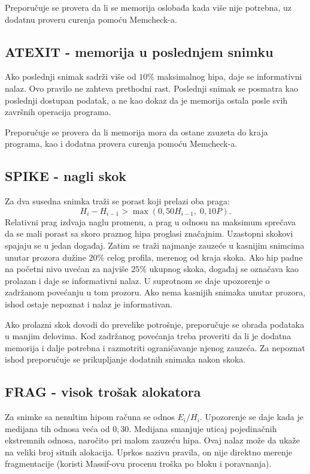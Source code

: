 \documentclass[a4paper,10pt]{article}
\begin{document}
Preporučuje se provera da li se memorija oslobađa kada više nije potrebna,
uz dodatnu proveru curenja pomoću Memcheck-a.

\subsection{ATEXIT - memorija u poslednjem snimku}
Ako poslednji snimak sadrži više od $10\%$ maksimalnog hipa, daje se informativni
nalaz. Ovo pravilo ne zahteva prethodni rast. Poslednji snimak se posmatra kao
poslednji dostupan podatak, a ne kao dokaz da je memorija ostala posle svih
završnih operacija programa.

Preporučuje se provera da li memorija mora da ostane zauzeta do kraja programa,
kao i dodatna provera curenja pomoću Memcheck-a.

\subsection{SPIKE - nagli skok}
Za dva susedna snimka traži se porast koji prelazi oba praga:
\[
  H_i-H_{i-1}>\max(0{,}50H_{i-1},\;0{,}10P).
\]
Relativni prag izdvaja naglu promenu, a prag u odnosu na maksimum sprečava da se
mali porast sa skoro praznog hipa proglasi značajnim. Uzastopni skokovi spajaju
se u jedan događaj. Zatim se traži najmanje zauzeće u kasnijim snimcima unutar
prozora dužine $20\%$ celog profila, merenog od kraja skoka.
Ako hip padne na početni nivo uvećan za najviše $25\%$ ukupnog skoka, događaj
se označava kao prolazan i daje se informativni nalaz. U suprotnom se daje
upozorenje o zadržanom povećanju u tom prozoru. Ako nema kasnijih snimaka unutar
prozora, ishod ostaje nepoznat i nalaz je informativan.

Ako prolazni skok dovodi do prevelike potrošnje, preporučuje se obrada
podataka u manjim delovima. Kod zadržanog povećanja treba proveriti da li je
dodatna memorija i dalje potrebna i razmotriti ograničavanje njenog zauzeća.
Za nepoznat ishod preporučuje se prikupljanje dodatnih snimaka nakon skoka.

\subsection{FRAG - visok trošak alokatora}
Za snimke sa nenultim hipom računa se odnos $E_i/H_i$. Upozorenje se daje kada
je medijana tih odnosa veća od $0{,}30$. Medijana smanjuje uticaj pojedinačnih
ekstremnih odnosa, naročito pri malom zauzeću hipa. Ovaj nalaz može da ukaže na
veliki broj sitnih alokacija. Uprkos nazivu pravila, on nije direktno merenje
fragmentacije (koristi Massif-ovu procenu troška po bloku i poravnanja).
\end{document}

